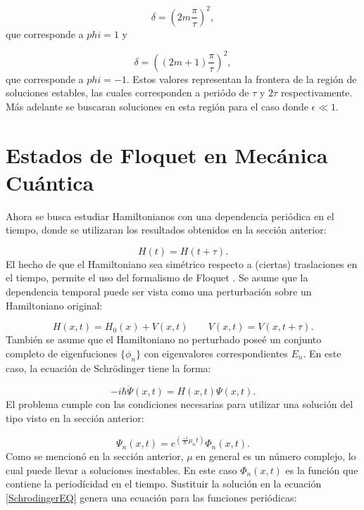 \documentclass[a4paper,10pt]{report}
\begin{document}
\begin{equation}
\delta = (2m\frac{\pi}{\tau})^2, 
\end{equation} que corresponde a $phi=1$ y

\begin{equation}
\delta = ((2m+1)\frac{\pi}{\tau})^2,
\end{equation} que corresponde a $phi=-1$. Estos valores representan la frontera de la región de soluciones estables, las cuales corresponden a periódo de $\tau$ y $2\tau$ respectivamente. Más adelante se buscaran soluciones en esta región para el caso donde $\epsilon \ll 1$.


\section{Estados de Floquet en Mecánica Cuántica}

Ahora se busca estudiar Hamiltonianos con una dependencia periódica en el tiempo, donde se utilizaran los resultados obtenidos en la sección anterior:

\begin{equation}
H(t)=H(t+\tau).
\end{equation} El hecho de que el Hamiltoniano sea simétrico respecto a (ciertas) traslaciones en el tiempo, permite el uso del formalismo de Floquet \cite{HanngiDQS}. Se asume que la dependencia temporal puede ser vista como una perturbación sobre un Hamiltoniano original:

\begin{equation}
H(x,t)=H_0(x)+V(x,t) \qquad V(x,t)=V(x,t+\tau).
\end{equation} También se asume que el Hamiltoniano no perturbado poseé un conjunto completo de eigenfuciones $\{\phi_n\}$ con eigenvalores correspondientes $E_n$. En este caso, la ecuación de Schr\"{o}dinger tiene la forma:

\begin{equation}\label{SchrodingerEQ}
-i\hbar\dot{\Psi}(x,t) = H(x,t)\Psi(x,t).
\end{equation} El problema cumple con las condiciones necesarias para utilizar una solución del tipo visto en la sección anterior:

\begin{equation}
\Psi_n(x,t) = e^{(\frac{-i}{\hbar}\mu_nt)}\Phi_n(x,t).
\end{equation} Como se mencionó en la sección anterior, $\mu$ en general es un número complejo, lo cual puede llevar a soluciones inestables. En este caso $\Phi_n(x,t)$ es la función que contiene la periodícidad en el tiempo. Sustituir la solución en la ecuación \ref{SchrodingerEQ} genera una ecuación para las funciones periódicas:
\end{document}
